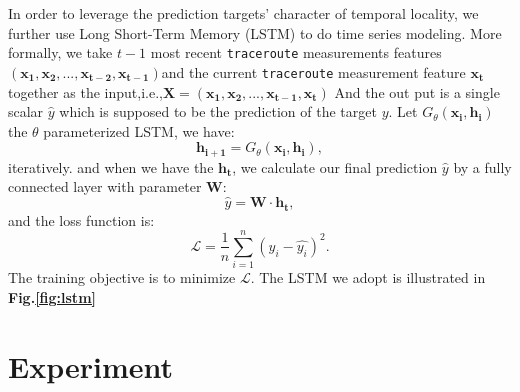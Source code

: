 \documentclass[sigconf]{acmart}
\begin{document}
	In order to leverage the prediction targets' character of temporal locality, we further use Long Short-Term Memory (LSTM) to do time series modeling. More formally, we take $t-1$ most recent \texttt{traceroute} measurements features $(\mathbf{x_1},\mathbf{x_2},...,\mathbf{x_{t-2}},\mathbf{x_{t-1}})$and the current \texttt{traceroute} measurement feature $\mathbf{x_t}$ together as the input,i.e.,$\mathbf{X}=(\mathbf{x_1},\mathbf{x_2},...,\mathbf{x_{t-1}},\mathbf{x_{t}})$ And the out put is a single scalar $\hat{y}$ which is supposed to be the prediction of the target $y$.
	Let $G_{\theta}(\mathbf{x_i},\mathbf{h_i})$ the $\theta$ parameterized LSTM, we have:
	\begin{equation}
	\mathbf{h_{i+1}}=G_{\theta}(\mathbf{x_i},\mathbf{h_i}),
	\end{equation}iteratively. and when we have the $\mathbf{h_{t}}$, we calculate our final prediction $\hat{y}$ by a fully connected layer with parameter $\mathbf{W}$:
	\begin{equation}
	\hat{y}=\mathbf{W}\cdot\mathbf{h_t},
	\end{equation}
	and the loss function is:
	\begin{equation}
	\mathcal{L}=\frac{1}{n}\sum_{i=1}^{n}(y_i-\hat{y_i})^2.
	\end{equation}
	The training objective is to minimize $\mathcal{L}$. The LSTM we adopt is illustrated in \textbf{Fig.\ref{fig:lstm}}
	
	
	
	\section{Experiment}
\end{document}
